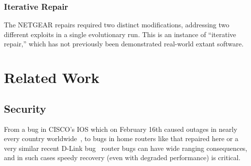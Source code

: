 \documentclass{sigcomm-alternate}
\begin{document}
\subsubsection{Iterative Repair}
\label{iterative-repair}
The NETGEAR  repairs required two distinct modifications, addressing two different
exploits in a single evolutionary run.  This is an instance of
``iterative repair,'' which has not previously been demonstrated 
real-world extant software.
%


\section{Related Work}
\subsection{Security}

From a bug in CISCO's IOS which on February 16th caused outages in
nearly every country worldwide~\cite{biggest-router-bug}, to bugs in
home routers like that repaired here or a very similar recent D-Link
bug~\cite{d-link} router bugs can have wide ranging consequences, and
in such cases speedy recovery (even with degraded performance) is
critical.
\end{document}
